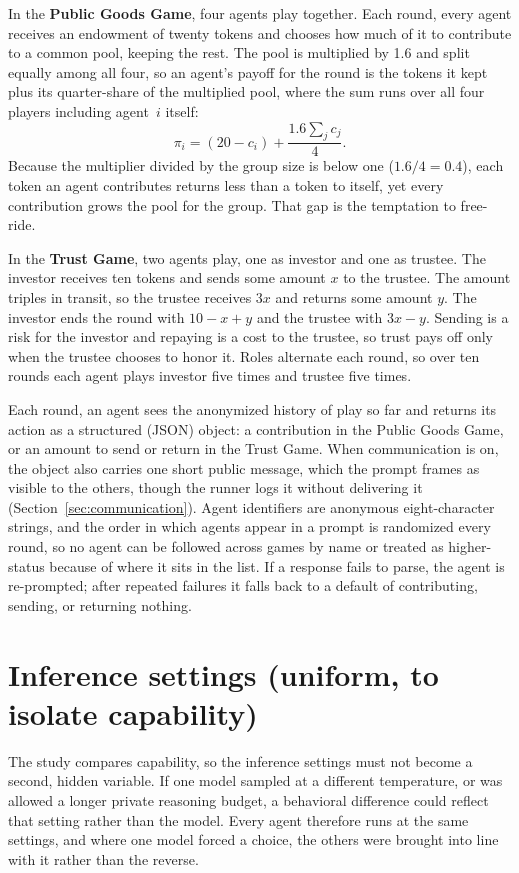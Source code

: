 In the \textbf{Public Goods Game}, four agents play together. Each round, every agent
receives an endowment of twenty tokens and chooses how much of it to contribute to a common
pool, keeping the rest. The pool is multiplied by 1.6 and split equally among all four, so
an agent's payoff for the round is the tokens it kept plus its quarter-share of the
multiplied pool, where the sum runs over all four players including agent~$i$ itself:
\[
  \pi_i = (20 - c_i) + \frac{1.6 \sum_{j} c_j}{4}.
\]
Because the multiplier divided by the group size is below one ($1.6/4 = 0.4$), each token an
agent contributes returns less than a token to itself, yet every contribution grows the
pool for the group. That gap is the temptation to free-ride.

In the \textbf{Trust Game}, two agents play, one as investor and one as trustee. The
investor receives ten tokens and sends some amount $x$ to the trustee. The amount triples in
transit, so the trustee receives $3x$ and returns some amount $y$. The investor ends the
round with $10 - x + y$ and the trustee with $3x - y$. Sending is a risk for the investor
and repaying is a cost to the trustee, so trust pays off only when the trustee chooses to
honor it. Roles alternate each round, so over ten rounds each agent plays investor five
times and trustee five times.

Each round, an agent sees the anonymized history of play so far and returns its action as a
structured (JSON) object: a contribution in the Public Goods Game, or an amount to send or
return in the Trust Game. When communication is on, the object also carries one short public
message, which the prompt frames as visible to the others, though the runner logs it
without delivering it (Section~\ref{sec:communication}). Agent identifiers are
anonymous eight-character strings, and the order in which agents appear in a prompt is
randomized every round, so no agent can be followed across games by name or treated as
higher-status because of where it sits in the list. If a response fails to parse, the agent
is re-prompted; after repeated failures it falls back to a default of contributing, sending,
or returning nothing.

\section{Inference settings (uniform, to isolate capability)}
\label{sec:inference}

The study compares capability, so the inference settings must not become a second, hidden
variable. If one model sampled at a different temperature, or was allowed a longer private
reasoning budget, a behavioral difference could reflect that setting rather than the model.
Every agent therefore runs at the same settings, and where one model forced a choice, the
others were brought into line with it rather than the reverse.


